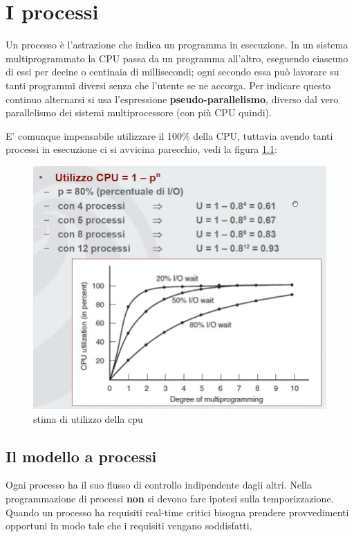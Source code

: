 \chapter{I processi}

\thispagestyle{empty}

Un processo è l'astrazione che indica un programma in esecuzione.
In un sistema multiprogrammato la CPU passa da un programma all'altro, eseguendo ciascuno di essi per decine o centinaia di millisecondi; ogni secondo essa può lavorare su tanti programmi diversi senza che l'utente se ne accorga.
Per indicare questo continuo alternarsi si usa l'espressione \textbf{pseudo-parallelismo}, diverso dal vero parallelismo dei sistemi multiprocessore (con più CPU quindi).

E' comunque impensabile utilizzare il 100\% della CPU, tuttavia avendo tanti processi in esecuzione ci si avvicina parecchio, vedi la figura \ref{cpu3}:

\begin{figure}[!ht]
  \centering
  \includegraphics[width=0.6\linewidth]{assets/cpu3.png}
  \caption{stima di utilizzo della cpu}
  \label{cpu3}
\end{figure}

\section{Il modello a processi}
Ogni processo ha il suo flusso di controllo indipendente dagli altri.
Nella programmazione di processi \textbf{non} si devono fare ipotesi sulla temporizzazione. Quando un processo ha requisiti real-time critici bisogna prendere provvedimenti opportuni in modo tale che i requisiti vengano soddisfatti.


